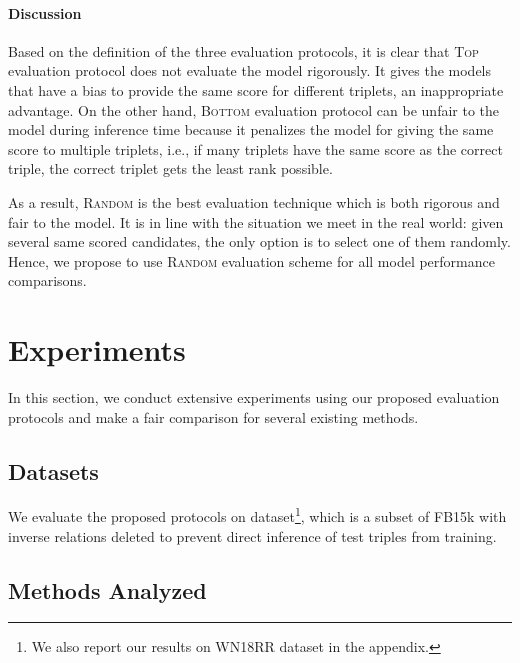 \documentclass[11pt,a4paper]{article}
\begin{document}
\setlength{\tabcolsep}{6pt}








\paragraph{Discussion} Based on the definition of the three evaluation protocols, it is clear that \textsc{Top} evaluation protocol does not evaluate the model rigorously. It gives the models that have a bias to provide the same score for different triplets, an inappropriate advantage.
On the other hand, \textsc{Bottom} evaluation protocol can be unfair to the model during inference time because it penalizes the model for giving the same score to multiple triplets, i.e., if many triplets have the same score as the correct triple, the correct triplet gets the least rank possible.

As a result, \textsc{Random} is the best evaluation technique which is both rigorous and fair to the model.
It is in line with the situation we meet in the real world: given several same scored candidates, the only option is to select one of them randomly.
Hence, we propose to use \textsc{Random} evaluation scheme for all model performance comparisons.

 
\section{Experiments}
\label{sec:experimental_setup}

In this section, we conduct extensive experiments using our proposed evaluation protocols and make a fair comparison for several existing methods.

\subsection{Datasets}
\label{sec:datasets}
We evaluate the proposed protocols on \datafb{} \cite{toutanova} dataset\footnote{We also report our results on WN18RR \cite{conve} dataset in the appendix.}, which is a subset of FB15k \cite{transe} with inverse relations deleted to prevent direct inference of test triples from training.

\subsection{Methods Analyzed}
\label{sec:baselines}
\end{document}
